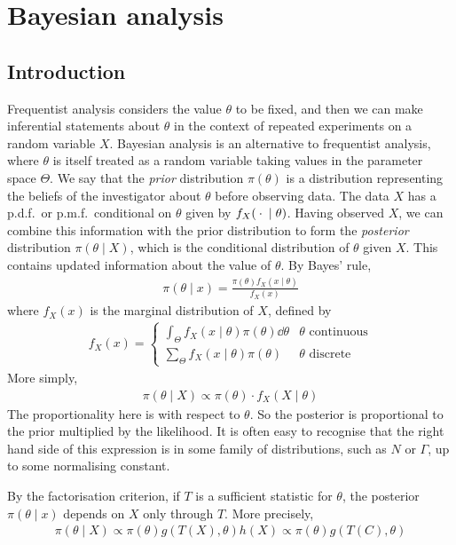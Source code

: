 \section{Bayesian analysis}

\subsection{Introduction}
Frequentist analysis considers the value $\theta$ to be fixed, and then we can make inferential statements about $\theta$ in the context of repeated experiments on a random variable $X$.
Bayesian analysis is an alternative to frequentist analysis, where $\theta$ is itself treated as a random variable taking values in the parameter space $\Theta$.
We say that the \textit{prior} distribution $\pi(\theta)$ is a distribution representing the beliefs of the investigator about $\theta$ before observing data.
The data $X$ has a p.d.f.\ or p.m.f.\ conditional on $\theta$ given by $f_X({}\cdot{} \mid \theta)$.
Having observed $X$, we can combine this information with the prior distribution to form the \textit{posterior} distribution $\pi(\theta \mid X)$, which is the conditional distribution of $\theta$ given $X$.
This contains updated information about the value of $\theta$.
By Bayes' rule,
\begin{align*}
	\pi(\theta \mid x) = \frac{\pi(\theta) f_X(x \mid \theta)}{f_X(x)}
\end{align*}
where $f_X(x)$ is the marginal distribution of $X$, defined by
\begin{align*}
	f_X(x) = \begin{cases}
		\int_\Theta f_X(x\mid\theta) \pi(\theta) \dd{\theta} & \theta \text{ continuous} \\
		\sum_\Theta f_X(x\mid\theta) \pi(\theta)             & \theta \text{ discrete}
	\end{cases}
\end{align*}
More simply,
\begin{align*}
	\pi(\theta \mid X) \propto \pi(\theta) \cdot f_X(X \mid \theta)
\end{align*}
The proportionality here is with respect to $\theta$.
So the posterior is proportional to the prior multiplied by the likelihood.
It is often easy to recognise that the right hand side of this expression is in some family of distributions, such as $N$ or $\Gamma$, up to some normalising constant.
\begin{remark}
	By the factorisation criterion, if $T$ is a sufficient statistic for $\theta$, the posterior $\pi(\theta \mid x)$ depends on $X$ only through $T$.
	More precisely,
	\begin{align*}
		\pi(\theta \mid X) \propto \pi(\theta) g(T(X),\theta) h(X) \propto \pi(\theta) g(T(C),\theta)
	\end{align*}
\end{remark}
